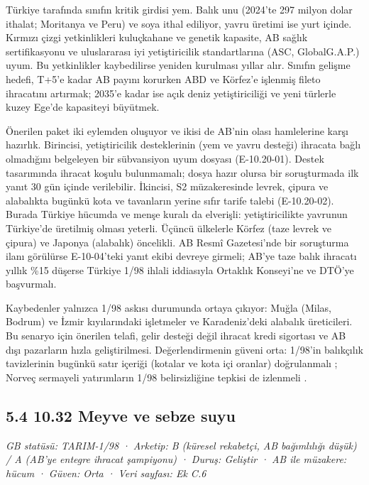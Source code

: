 Türkiye tarafında sınıfın kritik girdisi yem. Balık unu (2024'te 297 milyon dolar ithalat; Moritanya ve Peru) ve soya ithal ediliyor, yavru üretimi ise yurt içinde. Kırmızı çizgi yetkinlikleri kuluçkahane ve genetik kapasite, AB sağlık sertifikasyonu ve uluslararası iyi yetiştiricilik standartlarına (ASC, GlobalG.A.P.) uyum. Bu yetkinlikler kaybedilirse yeniden kurulması yıllar alır. Sınıfın gelişme hedefi, T+5'e kadar AB payını korurken ABD ve Körfez'e işlenmiş fileto ihracatını artırmak; 2035'e kadar ise açık deniz yetiştiriciliği ve yeni türlerle kuzey Ege'de kapasiteyi büyütmek.

Önerilen paket iki eylemden oluşuyor ve ikisi de AB'nin olası hamlelerine karşı hazırlık. Birincisi, yetiştiricilik desteklerinin (yem ve yavru desteği) ihracata bağlı olmadığını belgeleyen bir sübvansiyon uyum dosyası (E-10.20-01). Destek tasarımında ihracat koşulu bulunmamalı; dosya hazır olursa bir soruşturmada ilk yanıt 30 gün içinde verilebilir. İkincisi, S2 müzakeresinde levrek, çipura ve alabalıkta bugünkü kota ve tavanların yerine sıfır tarife talebi (E-10.20-02). Burada Türkiye hücumda ve menşe kuralı da elverişli: yetiştiricilikte yavrunun Türkiye'de üretilmiş olması yeterli. Üçüncü ülkelerle Körfez (taze levrek ve çipura) ve Japonya (alabalık) öncelikli. AB Resmî Gazetesi'nde bir soruşturma ilanı görülürse E-10-04'teki yanıt ekibi devreye girmeli; AB'ye taze balık ihracatı yıllık \%15 düşerse Türkiye 1/98 ihlali iddiasıyla Ortaklık Konseyi'ne ve DTÖ'ye başvurmalı.

Kaybedenler yalnızca 1/98 askısı durumunda ortaya çıkıyor: Muğla (Milas, Bodrum) ve İzmir kıyılarındaki işletmeler ve Karadeniz'deki alabalık üreticileri. Bu senaryo için önerilen telafi, gelir desteği değil ihracat kredi sigortası ve AB dışı pazarların hızla geliştirilmesi. Değerlendirmenin güveni orta: 1/98'in balıkçılık tavizlerinin bugünkü satır içeriği (kotalar ve kota içi oranlar) doğrulanmalı \etiketD{}; Norveç sermayeli yatırımların 1/98 belirsizliğine tepkisi de izlenmeli \etiketH{}.

\hypertarget{nace_kartlar_10-12-54-1032-meyve-ve-sebze-suyu}{%
\subsection{5.4 10.32 Meyve ve sebze suyu}\label{nace_kartlar_10-12-54-1032-meyve-ve-sebze-suyu}}

\emph{GB statüsü: TARIM-1/98 · Arketip: B (küresel rekabetçi, AB bağımlılığı düşük) / A (AB'ye entegre ihracat şampiyonu) · Duruş: Geliştir · AB ile müzakere: hücum · Güven: Orta · Veri sayfası: Ek C.6}

